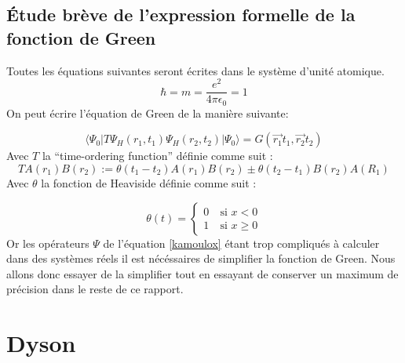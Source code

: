 \documentclass[12pt]{article}
\begin{document}
\subsection{\'Etude br\`eve de l'expression formelle de la fonction de Green}
Toutes les \'equations suivantes seront \'ecrites dans le syst\`eme d'unit\'e atomique.
\begin{equation}
 \hbar = m = \frac{e^2}{4 \pi \epsilon_0} = 1
\end{equation}
On peut \'ecrire l'\'equation de Green de la mani\`ere suivante:

\begin{equation}
\label{kamoulox}
 \langle \Psi_0 | T \Psi_H (r_1, t_1) \Psi_H (r_2, t_2) | \Psi_0 \rangle = G(\vec{r_1} t_1, \vec{r_2}  t_2)
\end{equation}
Avec $T$ la ``time-ordering function'' d\'efinie comme suit :
\begin{equation}
 T{A(r_1)B(r_2)} := \theta(t_1 - t_2)A(r_1)B(r_2) \pm \theta(t_2 - t_1)B(r_2) A(R_1)
\end{equation}
Avec $\theta$ la fonction de Heaviside d\'efinie comme suit :

\begin{equation}
\theta(t) = 
\left\{ \begin{array}{rl}
 0 &\ \text{si }x <0\\
 1 &\ \text{si }x \geq 0

\end{array} \right.
\end{equation}
Or les op\'erateurs $\Psi$ de l'\'equation \ref{kamoulox} \'etant trop compliqu\'es \`a calculer dans des syst\`emes r\'eels il est n\'ec\'essaires de simplifier la fonction de Green.
Nous allons donc essayer de la simplifier tout en essayant de conserver un maximum de pr\'ecision dans le reste de ce rapport.
\section{Dyson}
\end{document}
